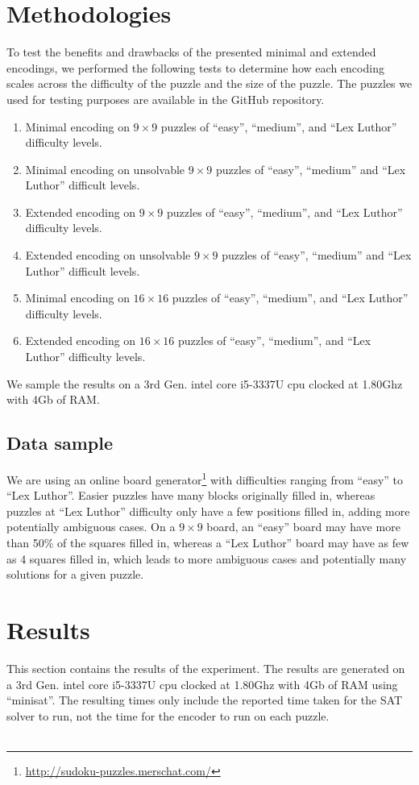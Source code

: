 \documentclass[conference,draftclsnofoot]{IEEEtran}
\begin{document}
\section{Methodologies}
To test the benefits and drawbacks of the presented minimal and extended
encodings, we performed the following tests to determine how each encoding
scales across the difficulty of the puzzle and the size of the puzzle. The
puzzles we used for testing purposes are available in the GitHub repository.\\
\begin{enumerate}
	\item Minimal encoding on $9 \times 9$ puzzles of ``easy'', ``medium'', and
		``Lex Luthor'' difficulty levels.
	\item Minimal encoding on unsolvable $9 \times 9$ puzzles of ``easy'',
		``medium'' and ``Lex Luthor'' difficult levels.
	\item Extended encoding on $9 \times 9$ puzzles of ``easy'', ``medium'', and
		``Lex Luthor'' difficulty levels.
	\item Extended encoding on unsolvable $9 \times 9$ puzzles of ``easy'',
		``medium'' and ``Lex Luthor'' difficult levels.
	\item Minimal encoding on $16 \times 16$ puzzles of
		``easy'', ``medium'', and ``Lex Luthor'' difficulty levels.
	\item Extended encoding	on $16 \times 16$ puzzles of
		``easy'', ``medium'', and ``Lex Luthor'' difficulty levels.
\end{enumerate}

We sample the results on a 3rd Gen. intel core i5-3337U cpu clocked at 1.80Ghz
with 4Gb of RAM.

\subsection{Data sample}
We are using an online board
generator\footnote{\url{http://sudoku-puzzles.merschat.com/}} with difficulties
ranging from ``easy'' to ``Lex Luthor''. Easier puzzles have many blocks
originally filled in, whereas puzzles at ``Lex Luthor'' difficulty only have a
few positions filled in, adding more potentially ambiguous cases. On a $9
\times 9$ board, an ``easy'' board may have more than 50\% of the squares
filled in, whereas a ``Lex Luthor'' board may have as few as 4 squares filled
in, which leads to more ambiguous cases and potentially many solutions for a
given puzzle.

\section{Results}
This section contains the results of the experiment.
The results are generated on a  3rd Gen. intel core i5-3337U cpu clocked at
1.80Ghz with 4Gb of RAM using ``minisat''. The resulting times only include the
reported time taken for the SAT solver to run, not the time for the encoder to
run on each puzzle.\\\\
\newpage
\end{document}
